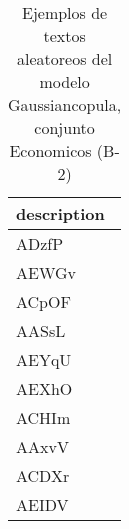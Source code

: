 \begin{table}[H]
\centering
\fontsize{8}{14}\selectfont
\caption{Ejemplos de textos aleatoreos del modelo Gaussiancopula, conjunto Economicos (B-2)}
\label{table-sample10-economicos-b-2-gaussiancopula-text}
\begin{tabular}{|m{50em}|}
\hline
\rowcolor[gray]{0.8}
description \\
\hline ADzfP \\
\hline AEWGv \\
\hline ACpOF \\
\hline AASsL \\
\hline AEYqU \\
\hline AEXhO \\
\hline ACHIm \\
\hline AAxvV \\
\hline ACDXr \\
\hline AEIDV \\
\hline
\end{tabular}
\end{table}
